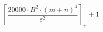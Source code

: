 \[\left\lceil \frac{20000 \cdot B^{2} \cdot \left(m + n\right)^{4}}{\varepsilon^{2}} \right\rceil_{+} + 1\]

